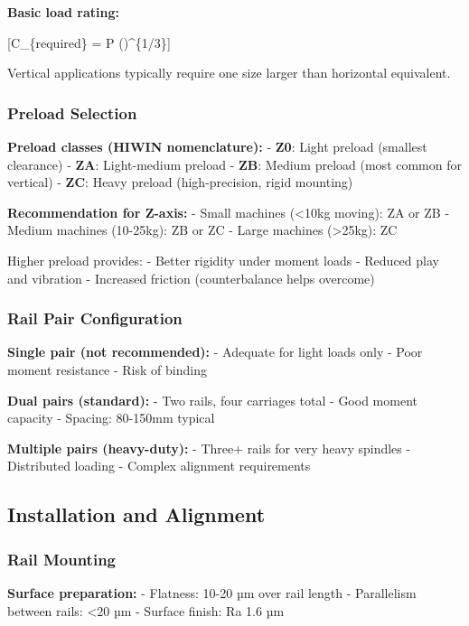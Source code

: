\documentclass[
]{article}
\begin{document}
\textbf{Basic load rating:}

{[}C\_\{required\} = P
\times \left(\right)\^{}\{1/3\}{]}

Vertical applications typically require one size larger than horizontal
equivalent.

\subsubsection{Preload Selection}\label{preload-selection}

\textbf{Preload classes (HIWIN nomenclature):} - \textbf{Z0}: Light
preload (smallest clearance) - \textbf{ZA}: Light-medium preload -
\textbf{ZB}: Medium preload (most common for vertical) - \textbf{ZC}:
Heavy preload (high-precision, rigid mounting)

\textbf{Recommendation for Z-axis:} - Small machines (\textless10kg
moving): ZA or ZB - Medium machines (10-25kg): ZB or ZC - Large machines
(\textgreater25kg): ZC

Higher preload provides: - Better rigidity under moment loads - Reduced
play and vibration - Increased friction (counterbalance helps overcome)

\subsubsection{Rail Pair Configuration}\label{rail-pair-configuration}

\textbf{Single pair (not recommended):} - Adequate for light loads only
- Poor moment resistance - Risk of binding

\textbf{Dual pairs (standard):} - Two rails, four carriages total - Good
moment capacity - Spacing: 80-150mm typical

\textbf{Multiple pairs (heavy-duty):} - Three+ rails for very heavy
spindles - Distributed loading - Complex alignment requirements

\subsection{Installation and
Alignment}\label{installation-and-alignment}

\subsubsection{Rail Mounting}\label{rail-mounting}

\textbf{Surface preparation:} - Flatness: 10-20 µm over rail length -
Parallelism between rails: \textless20 µm - Surface finish: Ra 1.6 µm
\end{document}
